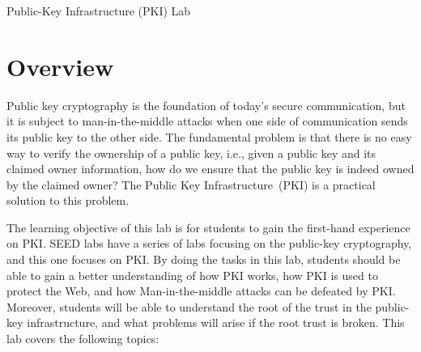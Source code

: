 




\newcommand{\pkiFigs}{./Figs}

\newcommand{\OpenSSL} {\texttt{OpenSSL}\xspace}
\newcommand{\pkiserver}{\texttt{SEEDPKILab2020.com}\xspace} 





\begin{center}
{\LARGE Public-Key Infrastructure (PKI) Lab}
\end{center}




\section{Overview}



Public key cryptography is the foundation of today's secure
communication, but it is subject
to man-in-the-middle attacks when one side of communication sends its
public key to the other side.  The fundamental problem is
that there is no easy way to verify the ownership of a public key, i.e., given a public key and
its claimed owner information, how do we ensure that the public key is indeed owned by
the claimed owner? The Public Key Infrastructure~(PKI) is a practical solution
to this problem.


The learning objective of this lab is for students to gain the first-hand 
experience on PKI. SEED labs have a series of labs focusing on the public-key cryptography, and 
this one focuses on PKI. By doing the tasks in this lab, students should be able to gain a 
better understanding of how PKI works, how PKI is used to protect the Web, and
how Man-in-the-middle attacks can be defeated by PKI. Moreover, students will be able to
understand the root of the trust in the public-key infrastructure, and what problems 
will arise if the root trust is broken.  This lab covers the following topics:

